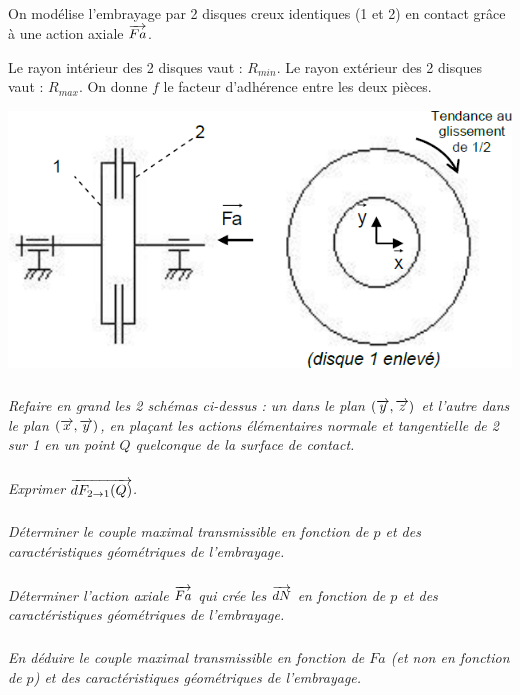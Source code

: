 \documentclass[10pt]{article}
\begin{document}
\begin{minipage}[c]{.55\linewidth}
On modélise l'embrayage par 2 disques creux identiques (1 et 2) en contact grâce à une 
action axiale $\overrightarrow{Fa}$. 
 
Le rayon intérieur des 2 disques vaut : $R_{min}$. 
Le rayon extérieur des 2 disques vaut : $R_{max}$. 
On donne $f$ le facteur d’adhérence entre les deux pièces. 



\end{minipage}\hfill
\begin{minipage}[c]{.4\linewidth}
\begin{center}
\includegraphics[width=.9\textwidth]{images/fig_07}
\end{center}
\end{minipage}

\subparagraph{}
\textit{Refaire en grand les 2 schémas ci-dessus : un dans le plan $(\overrightarrow{y}, \overrightarrow{z})$ et l’autre dans le plan $(\overrightarrow{x}, \overrightarrow{y})$, en plaçant les actions élémentaires normale et tangentielle de 2 sur 1 en un point $Q$ quelconque de la surface de contact.}

\subparagraph{}
\textit{Exprimer $\overrightarrow{dF_{2\rightarrow 1}(Q)}$.}

\subparagraph{}
\textit{Déterminer le couple maximal transmissible en fonction de $p$ et des caractéristiques 
géométriques de l’embrayage.}

\subparagraph{}
\textit{Déterminer l’action axiale $\overrightarrow{Fa}$ qui crée les $\overrightarrow{dN}$ en fonction de $p$ et des caractéristiques géométriques de l’embrayage.}

\subparagraph{}
\textit{En déduire le couple maximal transmissible en fonction de $Fa$ (et non en fonction de $p$) et des caractéristiques géométriques de l’embrayage.}
\end{document}
